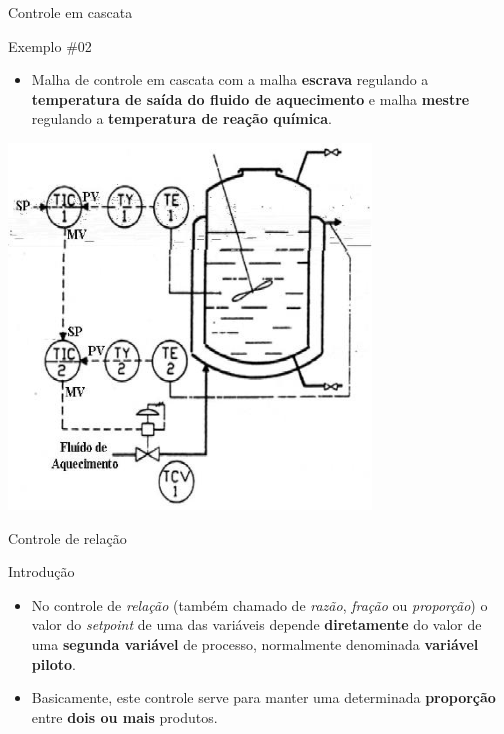 \begin{frame}{Controle em cascata}
	\begin{block}{Exemplo \#02}
		\begin{itemize}
			\item Malha de controle em cascata com a malha \textbf{escrava} regulando a \textbf{temperatura de saída do fluido de aquecimento} e malha \textbf{mestre} regulando a \textbf{temperatura de reação química}.
		\end{itemize}
	\end{block}
	
	\centering
	\includegraphics[width=0.45\linewidth]{Figuras/Ch15/fig5}
\end{frame}


\begin{frame}{Controle de relação}
	\begin{block}{Introdução}
		\begin{itemize}
			\item No controle de \textit{relação} (também chamado de \textit{razão}, \textit{fração} ou \textit{proporção}) o valor do \textit{setpoint} de uma das variáveis depende \textbf{diretamente} do valor de uma \textbf{segunda variável} de processo, normalmente denominada \textbf{variável piloto}.
			\item Basicamente, este controle serve para manter uma determinada \textbf{proporção} entre \textbf{dois ou mais} produtos.
		\end{itemize}
	\end{block}
\end{frame}


